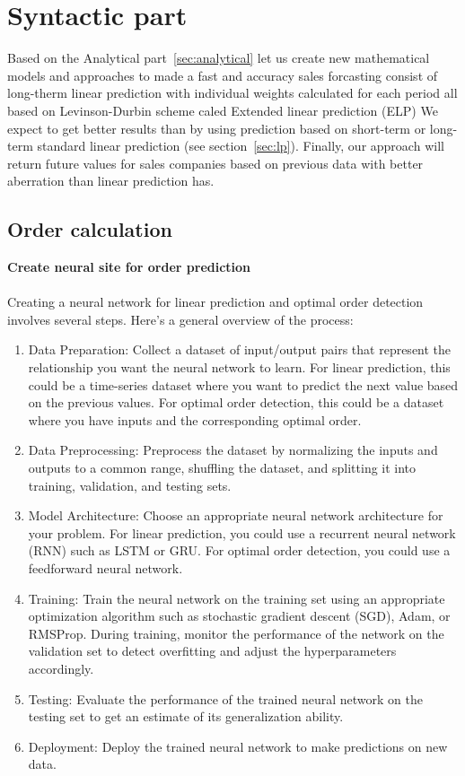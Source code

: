\chapter{Syntactic part} \label{sec:syntactic}
Based on the Analytical part~\ref{sec:analytical} let us create new mathematical models and approaches to made a fast and accuracy sales forcasting
consist of long-therm linear prediction with individual weights calculated for each period all based on Levinson-Durbin scheme caled Extended linear
prediction (ELP)
We expect to get better results than by using prediction based on short-term or long-term standard linear prediction (see section~\ref{sec:lp}).
Finally, our approach will return future values for sales companies based on previous data with better aberration than linear prediction has.
    \section{Order calculation} \label{sec:ordercalc}
        \textbf{Create neural site for order prediction}\\
        \\
        Creating a neural network for linear prediction and optimal order detection involves several steps. Here's a general overview of the process:
        \begin{enumerate}
            \item Data Preparation: Collect a dataset of input/output pairs that represent the relationship you want the neural network to learn.
            For linear prediction, this could be a time-series dataset where you want to predict the next value based on the previous values.
            For optimal order detection, this could be a dataset where you have inputs and the corresponding optimal order.
            \item Data Preprocessing: Preprocess the dataset by normalizing the inputs and outputs to a common range, shuffling the
            dataset, and splitting it into training, validation, and testing sets.
            \item Model Architecture: Choose an appropriate neural network architecture for your problem. For linear prediction, you could
            use a recurrent neural network (RNN) such as LSTM or GRU. For optimal order detection, you could use a feedforward neural network.
            \item Training: Train the neural network on the training set using an appropriate optimization algorithm
            such as stochastic gradient descent (SGD), Adam, or RMSProp. During training, monitor the performance of the
            network on the validation set to detect overfitting and adjust the hyperparameters accordingly.
            \item Testing: Evaluate the performance of the trained neural network on the testing set
            to get an estimate of its generalization ability.
            \item Deployment: Deploy the trained neural network to make predictions on new data.
        \end{enumerate}
